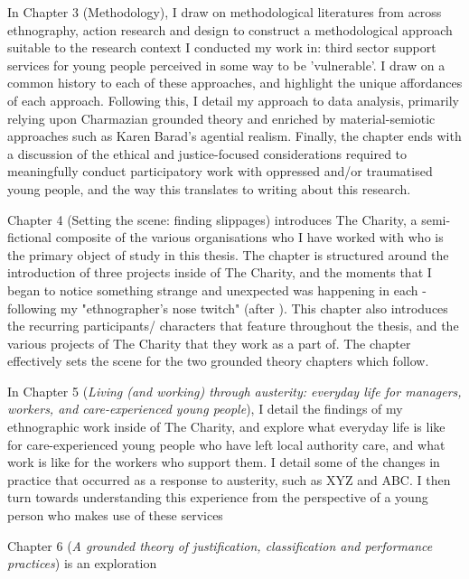 In Chapter 3 (Methodology), I draw on methodological literatures from across ethnography, action research and design to construct a methodological approach suitable to the research context I conducted my work in: third sector support services for young people perceived in some way to be 'vulnerable'. I draw on a common history to each of these approaches, and highlight the unique affordances of each approach. Following this, I detail my approach to data analysis, primarily relying upon Charmazian grounded theory and enriched by material-semiotic approaches such as Karen Barad's agential realism. Finally, the chapter ends with a discussion of the ethical and justice-focused considerations required to meaningfully conduct participatory work with oppressed and/or traumatised young people, and the way this translates to writing about this research. 

Chapter 4 (Setting the scene: finding slippages) introduces The Charity, a semi-fictional composite of the various organisations who I have worked with who is the primary object of study in this thesis. The chapter is structured around the introduction of three projects inside of The Charity, and the moments that I began to notice something strange and unexpected was happening in each - following my "ethnographer's nose twitch" (after \cite{star_ethnography_1999}). This chapter also introduces the recurring participants/ characters that feature throughout the thesis, and the various projects of The Charity that they work as a part of. The chapter effectively sets the scene for the two grounded theory chapters which follow.

In Chapter 5 (\emph{Living (and working) through austerity: everyday life for managers, workers, and care-experienced young people}), I detail the findings of my ethnographic work inside of The Charity, and explore what everyday life is like for care-experienced young people who have left local authority care, and what work is like for the workers who support them. I detail some of the changes in practice that occurred as a response to austerity, such as XYZ and ABC. I then turn towards understanding this experience from the perspective of a young person who makes use of these services

Chapter 6 (\textit{A grounded theory of justification, classification and performance practices}) is an exploration


